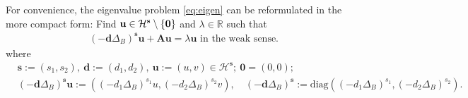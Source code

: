 \documentclass[a4paper,11pt]{amsart}
\theoremstyle{definition}
\def\R{\mathbb{R}}
\numberwithin{equation}{section}
\theoremstyle{definition}
\begin{document}


For convenience, the eigenvalue problem \eqref{eq:eigen} can be reformulated in the more compact form: Find $\textbf{u} \in \mathcal{H}^{\textbf{s}}\setminus\{\bf 0\}$ and $\lambda\in \R$ such that
\begin{align*}
(-\textbf{d}\Delta_B)^{\textbf{s}}\textbf{u} + \textbf{Au}=\lambda \textbf{u} \text{ in the weak sense.}
\end{align*}
where
\begin{align*}
&\textbf{s}:=(s_1,s_2),~\textbf{d}:=(d_1,d_2),~\textbf{u}:=(u,v)\in \mathcal{H}^{\textbf{s}};~\textbf{0}=(0,0);\\
&(-\textbf{d}\Delta_B)^{\textbf{s}}\textbf{u}:=\left((-d_1\Delta_B)^{s_1}u,(-d_2\Delta_B)^{s_2}v\right),\quad (-\textbf{d}\Delta_B)^{\textbf{s}}:= \mathrm{diag}((-d_1\Delta_B)^{s_1},(-d_2\Delta_B)^{s_2}).
\end{align*}
\end{document}

